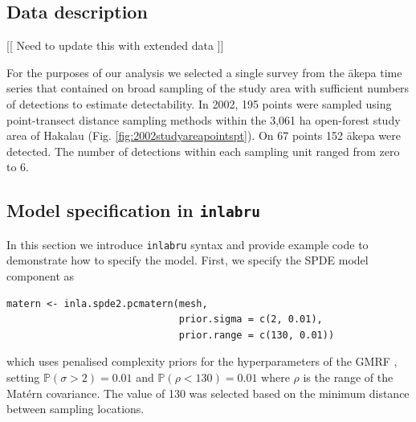 \documentclass[preprint,12pt]{elsarticle}
\newcommand{\akepa}{\textquotesingle\={a}kepa}  %
\begin{document}
\subsection*{Data description}
[[ Need to update this with extended data ]]

For the purposes of our analysis we selected a single survey from the \akepa{} time series that contained on broad sampling of the study area with sufficient numbers of detections to estimate detectability. In 2002, 195 points were sampled using point-transect distance sampling methods within the 3,061 ha open-forest study area of Hakalau (Fig. \ref{fig:2002studyareapointspt}). On 67 points 152 \akepa{} were detected. The number of detections within each sampling unit ranged from zero to 6. 



\subsection*{Model specification in \texttt{inlabru}}


In this section we introduce \texttt{inlabru} syntax and provide example code to demonstrate how to specify the model.  First, we specify the SPDE model component as
\begin{lstlisting}
matern <- inla.spde2.pcmatern(mesh, 
                              prior.sigma = c(2, 0.01),    
                              prior.range = c(130, 0.01))
\end{lstlisting}
which uses penalised complexity priors for the hyperparameters of the GMRF \citep{simpson_penalising_2017}, setting $\mathbb{P}(\sigma > 2) = 0.01$ and $\mathbb{P}(\rho < 130) = 0.01$ where $\rho$ is the range of the Mat\'ern covariance.  The value of 130 was selected based on the minimum distance between sampling locations.     
\end{document}
